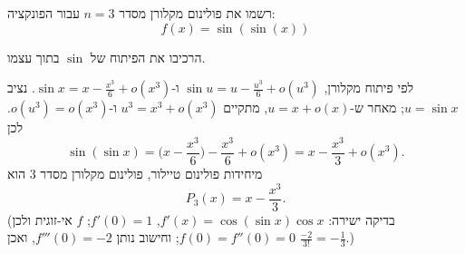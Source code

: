 
\begin{question}
רשמו את פולינום מקלורן מסדר $n=3$ עבור הפונקציה:
\[ f(x)=\sin(\sin(x)) \]
\end{question}

\begin{hint}
הרכיבו את הפיתוח של $\sin$ בתוך עצמו.
\end{hint}

\begin{solution}
לפי פיתוח מקלורן, $\sin u=u-\frac{u^3}{6}+o(u^3)$ ו-$\sin x=x-\frac{x^3}{6}+o(x^3)$. נציב $u=\sin x$; מאחר ש-$u=x+o(x)$, מתקיים $u^3=x^3+o(x^3)$ ו-$o(u^3)=o(x^3)$. לכן
\[ \sin(\sin x)=\Big(x-\frac{x^3}{6}\Big)-\frac{x^3}{6}+o(x^3)=x-\frac{x^3}{3}+o(x^3). \]
מיחידות פולינום טיילור, פולינום מקלורן מסדר 3 הוא
\[ \boxed{P_3(x)=x-\frac{x^3}{3}} . \]
(בדיקה ישירה: $f'(x)=\cos(\sin x)\cos x$, $f'(0)=1$; $f$ אי-זוגית ולכן $f(0)=f''(0)=0$; וחישוב נותן $f'''(0)=-2$, ואכן $\frac{-2}{3!}=-\frac13$.)
\end{solution}
